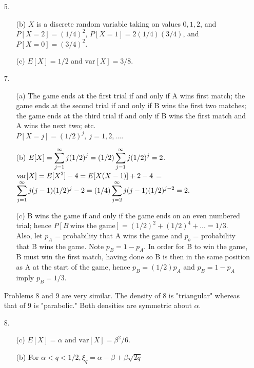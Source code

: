 \begin{enumerate}
	\item[5.] \begin{enumerate}
		
		\item[(b)] $X$ is a discrete random variable taking on values $0, 1, 2$, and $P[X=2]=(1/4)^2$, $P[X=1]= 2(1/4)(3/4)$, and $P[X=0]=(3/4)^2$. 
		
		\item[(c)] $E[X]=1/2$ and $\text{var}[X]=3/8$.
		
		\end{enumerate}
	
	\item[7.] \begin{enumerate}
		\item[(a)] The game ends at the first trial if and only if A wins first match; the game ends at the second trial if and only if B wins the first two matches; the game ends at the third trial if and only if B wins the first match and A wins the next two; etc. \\
		$P[X=j] = (1/2)^j,\ j = 1,2, \ldots.$
		
		\item[(b)] $\displaystyle E[X] = \sum_{j=1}^{\infty} j(1/2)^j = (1/2)\sum_{j=1}^\infty j(1/2)^j = 2$. \\
		$\displaystyle \text{var}[X] = E[X^2] - 4 = E[X(X-1)] +2 - 4 $ = \\ $\displaystyle  \sum_{j=1}^\infty j(j-1)(1/2)^j - 2 = (1/4)\sum_{j=2}^\infty j(j-1)(1/2)^{j-2} = 2.$  

		\item[(c)] B wins the game if and only if the game ends on an even numbered trial; hence 
		$P[B\ \text{wins the game}] = (1/2)^2 + (1/2)^4 + \ldots = 1/3$. \\
		Also, let $p_A$ = probability that A wins the game and $p_b$ = probability that B wins the game.  Note $p_B = 1-p_A$.  In order for B to win the game, B must win the first match, having done so B is then in the same position as A at the start of the game, hence $p_B = (1/2)p_A$ and $p_B=1-p_A$ imply $p_B=1/3$.  
		
		\end{enumerate}
		Problems 8 and 9 are very similar.  The density of 8 is "triangular" whereas that of 9 is "parabolic."  Both densities are symmetric about $\alpha$.
	
	\item[8.] \begin{enumerate}
		\item[(c)] $E[X] = \alpha$ and $\text{var}[X]=\beta^2/6$.
		\item[(b)] For $\alpha < q < 1/2, \xi_q  = \alpha - \beta + \beta\sqrt{2q}$
	\end{enumerate}


\end{enumerate}
